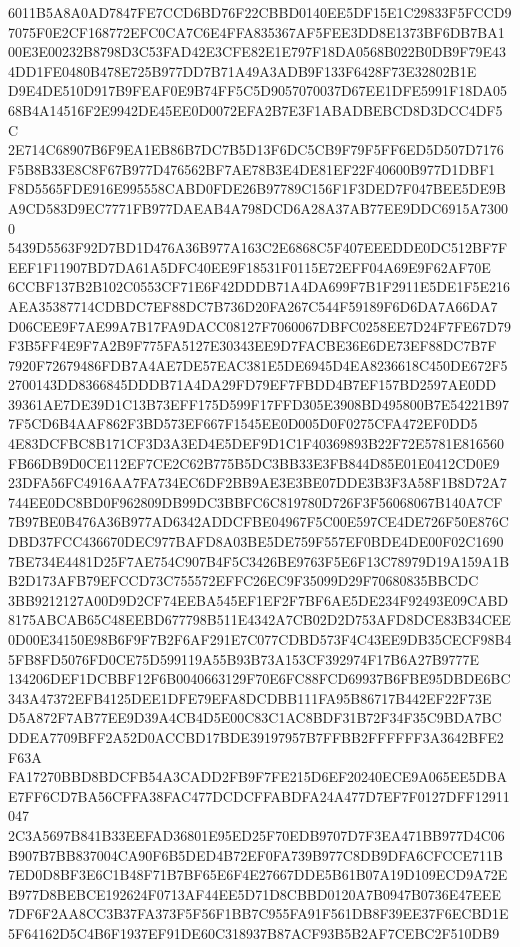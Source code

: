 \documentclass[UTF8,fontset=fandol,zihao=-4,a4paper]{ctexart}
\begin{document}
{{6011B5A8A0AD7847FE7CCD6BD76F22CBBD0140EE5DF15E1C29833F5FCCD97075F0E2CF168772EFC0CA7C6E4FFA835367AF5FEE3DD8E1373BF6DB7BA1
00E3E00232B8798D3C53FAD42E3CFE82E1E797F18DA0568B022B0DB9F79E434DD1FE0480B478E725B977DD7B71A49A3ADB9F133F6428F73E32802B1E
D9E4DE510D917B9FEAF0E9B74FF5C5D9057070037D67EE1DFE5991F18DA0568B4A14516F2E9942DE45EE0D0072EFA2B7E3F1ABADBEBCD8D3DCC4DF5C
2E714C68907B6F9EA1EB86B7DC7B5D13F6DC5CB9F79F5FF6ED5D507D7176F5B8B33E8C8F67B977D476562BF7AE78B3E4DE81EF22F40600B977D1DBF1
F8D5565FDE916E995558CABD0FDE26B97789C156F1F3DED7F047BEE5DE9BA9CD583D9EC7771FB977DAEAB4A798DCD6A28A37AB77EE9DDC6915A73000
5439D5563F92D7BD1D476A36B977A163C2E6868C5F407EEEDDE0DC512BF7FEEF1F11907BD7DA61A5DFC40EE9F18531F0115E72EFF04A69E9F62AF70E
6CCBF137B2B102C0553CF71E6F42DDDB71A4DA699F7B1F2911E5DE1F5E216AEA35387714CDBDC7EF88DC7B736D20FA267C544F59189F6D6DA7A66DA7
D06CEE9F7AE99A7B17FA9DACC08127F7060067DBFC0258EE7D24F7FE67D79F3B5FF4E9F7A2B9F775FA5127E30343EE9D7FACBE36E6DE73EF88DC7B7F
7920F72679486FDB7A4AE7DE57EAC381E5DE6945D4EA8236618C450DE672F52700143DD8366845DDDB71A4DA29FD79EF7FBDD4B7EF157BD2597AE0DD
39361AE7DE39D1C13B73EFF175D599F17FFD305E3908BD495800B7E54221B977F5CD6B4AAF862F3BD573EF667F1545EE0D005D0F0275CFA472EF0DD5
4E83DCFBC8B171CF3D3A3ED4E5DEF9D1C1F40369893B22F72E5781E816560FB66DB9D0CE112EF7CE2C62B775B5DC3BB33E3FB844D85E01E0412CD0E9
23DFA56FC4916AA7FA734EC6DF2BB9AE3E3BE07DDE3B3F3A58F1B8D72A7744EE0DC8BD0F962809DB99DC3BBFC6C819780D726F3F56068067B140A7CF
7B97BE0B476A36B977AD6342ADDCFBE04967F5C00E597CE4DE726F50E876CDBD37FCC436670DEC977BAFD8A03BE5DE759F557EF0BDE4DE00F02C1690
7BE734E4481D25F7AE754C907B4F5C3426BE9763F5E6F13C78979D19A159A1BB2D173AFB79EFCCD73C755572EFFC26EC9F35099D29F70680835BBCDC
3BB9212127A00D9D2CF74EEBA545EF1EF2F7BF6AE5DE234F92493E09CABD8175ABCAB65C48EEBD677798B511E4342A7CB02D2D753AFD8DCE83B34CEE
0D00E34150E98B6F9F7B2F6AF291E7C077CDBD573F4C43EE9DB35CECF98B45FB8FD5076FD0CE75D599119A55B93B73A153CF392974F17B6A27B9777E
134206DEF1DCBBF12F6B0040663129F70E6FC88FCD69937B6FBE95DBDE6BC343A47372EFB4125DEE1DFE79EFA8DCDBB111FA95B86717B442EF22F73E
D5A872F7AB77EE9D39A4CB4D5E00C83C1AC8BDF31B72F34F35C9BDA7BCDDEA7709BFF2A52D0ACCBD17BDE39197957B7FFBB2FFFFFF3A3642BFE2F63A
FA17270BBD8BDCFB54A3CADD2FB9F7FE215D6EF20240ECE9A065EE5DBAE7FF6CD7BA56CFFA38FAC477DCDCFFABDFA24A477D7EF7F0127DFF12911047
2C3A5697B841B33EEFAD36801E95ED25F70EDB9707D7F3EA471BB977D4C06B907B7BB837004CA90F6B5DED4B72EF0FA739B977C8DB9DFA6CFCCE711B
7ED0D8BF3E6C1B48F71B7BF65E6F4E27667DDE5B61B07A19D109ECD9A72EB977D8BEBCE192624F0713AF44EE5D71D8CBBD0120A7B0947B0736E47EEE
7DF6F2AA8CC3B37FA373F5F56F1BB7C955FA91F561DB8F39EE37F6ECBD1E5F64162D5C4B6F1937EF91DE60C318937B87ACF93B5B2AF7CEBC2F510DB9
}}
\end{document}
